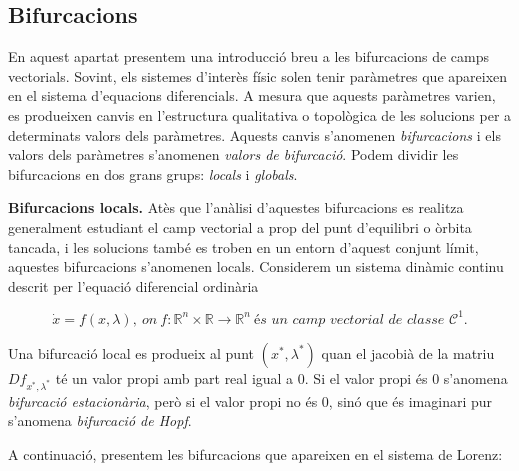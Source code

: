 \documentclass[11pt,a4paper,openright,oneside]{article}
\numberwithin{equation}{section}
\theoremstyle{definition}
\begin{document}
\subsection{Bifurcacions}\label{sssec:bifurcacions}

En aquest apartat presentem una introducció breu a les bifurcacions de camps vectorials. Sovint, els sistemes d'interès físic solen tenir paràmetres que apareixen en el sistema d'equacions diferencials. A mesura que aquests paràmetres varien, es produeixen canvis en l'estructura qualitativa o topològica de les solucions per a determinats valors dels paràmetres. Aquests canvis s'anomenen \textit{bifurcacions} i els valors dels paràmetres s'anomenen \textit{valors de bifurcació}. Podem dividir les bifurcacions en dos grans grups: \textit{locals} i \textit{globals}.

\textbf{Bifurcacions locals.} Atès que l'anàlisi d'aquestes bifurcacions es realitza generalment estudiant el camp vectorial a prop del punt d'equilibri o òrbita tancada, i les solucions també es troben en un entorn d'aquest conjunt límit, aquestes bifurcacions s'anomenen locals. Considerem un sistema dinàmic continu descrit per l'equació diferencial ordinària 

\begin{equation*}
    \dot{x}=f(x,\lambda), \ on \ f:\mathbb{R}^n\times \mathbb{R}\rightarrow{\mathbb{R}^n} \ \textit{és un camp vectorial de classe $\mathcal{C}^1$}.
\end{equation*}

Una bifurcació local es produeix al punt $\left(x^{*}, \lambda^{*}\right)$ quan el jacobià de la matriu $Df_{x^{*},\lambda^{*}}$ té un valor propi amb part real igual a $0$. Si el valor propi és $0$ s'anomena \textit{bifurcació estacionària}, però si el valor propi no és $0$, sinó que és imaginari pur s'anomena \textit{bifurcació de Hopf}.

A continuació, presentem les bifurcacions que apareixen en el sistema de Lorenz:
\end{document}
